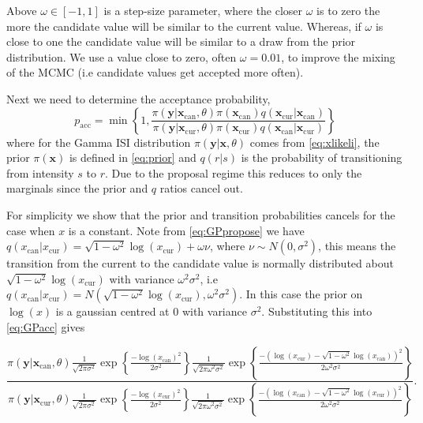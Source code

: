 \documentclass[../main.tex]{subfiles}
\begin{document}
Above $\omega \in [-1,1] $ is a step-size parameter, where the closer $\omega$ is to zero the more the candidate value will be similar to the current value. Whereas, if $\omega$ is close to one the candidate value will be similar to a draw from the prior distribution. We use a value close to zero, often $\omega = 0.01$,  to improve the mixing of the MCMC (i.e candidate values get accepted more often).

Next we need to determine the acceptance probability, 
\begin{equation}\label{eq:GPacc}
p_{\mathrm{acc}} = \min \left\{ 1, \frac{\pi \left( \mathbf{y} | \mathbf{x}_{\mathrm{can}}, \theta \right) \pi\left(  \mathbf{x}_{\mathrm{can}}\right) q \left( \mathbf{x}_{\mathrm{cur}} |\mathbf{x}_{\mathrm{can}} \right)}
{\pi \left( \mathbf{y} | \mathbf{x}_{\mathrm{cur}}, \theta \right) \pi \left(  \mathbf{x}_{\mathrm{cur}} \right) q \left( \mathbf{x}_{\mathrm{can}} |\mathbf{x}_{\mathrm{cur}} \right)} \right\}
\end{equation}
where for the Gamma ISI distribution $\pi \left( \mathbf{y} | \mathbf{x},\theta \right)$ comes from \eqref{eq:xlikeli}, the prior $\pi (\mathbf{x})$ is defined in \eqref{eq:prior} and $q( r | s )$ is the probability of transitioning from intensity $s$ to $r$. Due to the proposal regime this reduces to only the marginals since the prior and $q$ ratios cancel out. %

For simplicity we show that the prior and transition probabilities cancels for the case when $x$ is a constant. Note from \eqref{eq:GPpropose} we have $q\left(x_{\mathrm{can}} | x_{\mathrm{cur}} \right) = \sqrt{1-\omega ^2} \log(x_{\mathrm{cur}}) + \omega \nu$, where $\nu \sim N(0,\sigma^2)$, this means the transition from the current to the candidate value is normally distributed about $\sqrt{1-\omega ^2} \log(x_{\mathrm{cur}})$ with variance $\omega^2\sigma^2$, i.e  $q\left(x_{\mathrm{can}} | x_{\mathrm{cur}} \right) = N \left(\sqrt{1-\omega ^2} \log(x_{\mathrm{cur}}), \omega^2\sigma^2 \right)$. 
In this case the prior on $\log(x)$ is a gaussian centred at $0$ with variance $\sigma^2$. Substituting this into \eqref{eq:GPacc} gives
 
\begin{equation}
 \frac{\pi \left( \mathbf{y} | \mathbf{x}_{\mathrm{can}},\theta \right) 
 \frac{1}{\sqrt{2  \pi \sigma^2}} \exp\left\{ \frac{-\log(x_{\mathrm{can}})^2}{2 \sigma^2} \right\}
\frac{1}{\sqrt{2  \pi \omega^2 \sigma^2}} \exp\left\{ \frac{-\left( \log(x_{\mathrm{cur}}) - \sqrt{1-\omega ^2} \log(x_{\mathrm{can}})  \right)^2 }{2 \omega^2\sigma^2} \right\}
 }
{\pi \left( \mathbf{y} | \mathbf{x}_{\mathrm{cur}},\theta \right) 
 \frac{1}{\sqrt{2  \pi \sigma^2}} \exp\left\{ \frac{-\log(x_{\mathrm{cur}})^2}{2 \sigma^2} \right\}
 \frac{1}{\sqrt{2 \pi \omega^2 \sigma^2}} \exp\left\{ \frac{-\left( \log(x_{\mathrm{can}}) - \sqrt{1-\omega ^2} \log(x_{\mathrm{cur}})  \right)^2 }{2 \omega^2\sigma^2} \right\}
}.
\end{equation}
\end{document}
